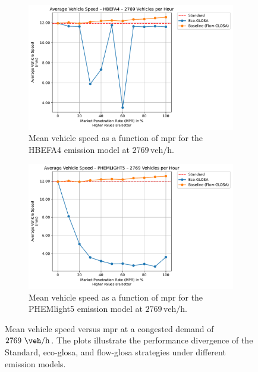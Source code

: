 \begin{figure}[htb]
  \centering
  \begin{subfigure}[b]{0.49\textwidth}
    \includegraphics[width=\textwidth]{data/img/AverageVehicleSpeed/AverageVehicleSpeed_HBEFA4_Cars2769.pdf}
    \caption{Mean vehicle speed as a function of \ac{mpr} for the HBEFA4 emission model at $2769\,\mathrm{veh/h}$.}
    \label{fig:MeanSpeed_HBEFA4_2769}
  \end{subfigure}\hfill
  \begin{subfigure}[b]{0.49\textwidth}
    \includegraphics[width=\textwidth]{data/img/AverageVehicleSpeed/AverageVehicleSpeed_PHEMLIGHT5_Cars2769.pdf}
    \caption{Mean vehicle speed as a function of \ac{mpr} for the PHEMlight5 emission model at $2769\,\mathrm{veh/h}$.}
    \label{fig:MeanSpeed_PHEM_2769}
  \end{subfigure}
  \caption[Mean vehicle speed vs. \ac{mpr} at $2769~\unit{\veh\per\hour}$]{Mean vehicle speed versus \ac{mpr} at a congested demand of $2769~\unit{\veh\per\hour}$. The plots illustrate the performance divergence of the Standard, \ac{eco-glosa}, and \ac{flow-glosa} strategies under different emission models.}
\label{fig:MeanSpeed_2769}
\end{figure}

